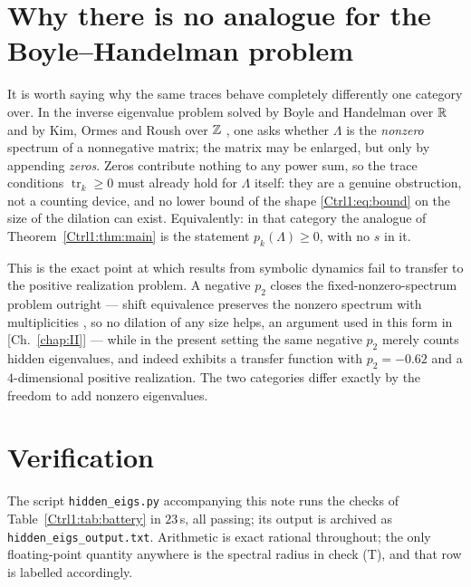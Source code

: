 \section{Why there is no analogue for the Boyle--Handelman problem}\label{Ctrl1:sec:bh}

It is worth saying why the same traces behave completely differently one category over.
In the inverse eigenvalue problem solved by Boyle and Handelman over $\mathbb{R}$ \cite{BH91} and by
Kim, Ormes and Roush over $\mathbb{Z}$ \cite{KOR00}, one asks whether $\Lambda$ is the \emph{nonzero}
spectrum of a nonnegative matrix; the matrix may be enlarged, but only by appending
\emph{zeros}. Zeros contribute nothing to any power sum, so the trace conditions
$\operatorname{tr}_k\ge0$ must already hold for $\Lambda$ itself: they are a genuine
obstruction, not a counting device, and no lower bound of the shape \eqref{Ctrl1:eq:bound} on the
size of the dilation can exist. Equivalently: in that category the analogue of
Theorem~\ref{Ctrl1:thm:main} is the statement $p_k(\Lambda)\ge0$, with no $s$ in it.

This is the exact point at which results from symbolic dynamics fail to transfer to the
positive realization problem. A negative $p_2$ closes the fixed-nonzero-spectrum problem
outright --- shift equivalence preserves the nonzero spectrum with multiplicities
\cite[\S7.4]{LM95}, so no dilation of any size helps, an argument used in this form in
[Ch.~\ref{chap:II}] --- while in the present setting the same negative $p_2$ merely counts
hidden eigenvalues, and indeed \cite[Ex.~8]{BF04} exhibits a transfer function with
$p_2=-0.62$ and a $4$-dimensional positive realization. The two categories differ exactly by
the freedom to add nonzero eigenvalues.

\section{Verification}\label{Ctrl1:sec:battery}

The script \texttt{hidden\_eigs.py} accompanying this note runs the checks of
Table~\ref{Ctrl1:tab:battery} in $23$\,s, all passing; its output is archived as
\texttt{hidden\_eigs\_output.txt}. Arithmetic is exact rational throughout; the only
floating-point quantity anywhere is the spectral radius in check (T), and that row is
labelled accordingly.

